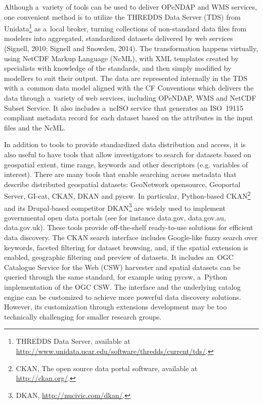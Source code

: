 \documentclass[osd, online, hvmath]{copernicus}
\begin{document}
Although a~variety of tools can be used to deliver OPeNDAP and WMS
services, one convenient method is to utilize the THREDDS Data Server
(TDS) from Unidata\footnote{THREDDS Data Server, available at
  \url{http://www.unidata.ucar.edu/software/thredds/current/tds/}.} as
a~local broker, turning collections of non-standard data files from
modelers into aggregated, standardized datasets delivered by web
services (Signell, 2010; Signell and Snowden, 2014). The
transformation happens virtually, using NetCDF Markup Language (NcML),
with XML templates created by specialists with knowledge of the standards,
and then simply modified by modellers to suit their output. The data are represented
internally in the TDS with a~common data model aligned with the
CF Conventions which delivers the data through
a~variety of web services, including OPeNDAP, WMS and NetCDF Subset
Service.  It also includes a~ncISO service that generates an ISO~19115
compliant metadata record for each dataset based on the attributes in the
input files and the NcML.

In addition to tools to provide standardized data distribution and
access, it is also useful to have tools that allow investigators to
search for datasets based on geospatial extent, time range, keywords and other descriptors 
(e.g. variables of interest).  
There are many tools that enable
searching across metadata that describe distributed geospatial
datasets: GeoNetwork opensource, Geoportal Server, GI-cat, CKAN, DKAN
and pycsw. In particular, Python-based CKAN\footnote{CKAN, The open
  source data portal software, available at \url{http://ckan.org/}.}
and its Drupal-based competitor DKAN\footnote{DKAN,
  \url{http://nucivic.com/dkan/}.} are widely used to implement
governmental open data portals (see for instance data.gov,
data.gov.au, data.gov.uk). These tools 
 provide off-the-shelf
ready-to-use solutions for efficient data discovery. The CKAN search
interface includes Google-like fuzzy search over keywords, faceted
filtering for dataset browsing, and, if the spatial extension is
enabled, geographic filtering and preview of datasets. It includes
an~OGC Catalogue Service for the Web (CSW) harvester and spatial datasets can be
queried through the same standard, for example using
pycsw, a~Python
implementation of the OGC CSW. The interface and the underlying
catalog engine can be customized to achieve more powerful data
discovery solutions. However, its customization through extensions
development may be too technically challenging for smaller research groups.
\end{document}
